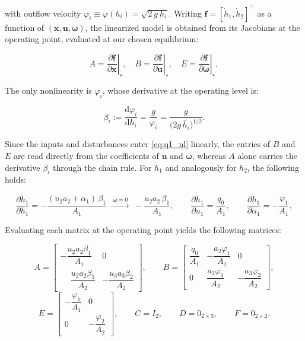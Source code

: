 \documentclass[10pt,a4paper]{scrartcl}
\begin{document}
with outflow velocity $\varphi_i \equiv \varphi(h_i) = \sqrt{2 \ g \ h_i}$. Writing $\bm f = [\dot h_1, \dot h_2]^\top$ as a function of $(\bm x, \bm u, \bm \omega)$, the linearized model is obtained from its Jacobians at the operating point, evaluated at our chosen equilibrium:

\begin{equation}
    A=\left.\frac{\partial\bm{f}}{\partial\bm{x}}\right|_\star,\quad
    B=\left.\frac{\partial\bm{f}}{\partial\bm{u}}\right|_\star,\quad
    E=\left.\frac{\partial\bm{f}}{\partial\bm{\omega}}\right|_\star,
    \label{eq:q1_jac}
\end{equation}

The only nonlinearity is $\varphi_i$, whose derivative at the operating level is: 


\begin{equation}
    \beta_i:=\frac{\mathrm{d}\varphi_i}{\mathrm{d}h_i}
    =\frac{g}{\varphi_i}=\frac{g}{\Big({2g\,\bar h_i}\Big)^{1/2}} .
    \label{eq:q1_beta}
\end{equation}

Since the inputs and disturbances enter \eqref{eq:q1_nl} linearly, the entries of $B$ and $E$ are read directly from the coefficients of $\bm u$ and $\bm \omega$, whereas $A$ alone carries the derivative $\beta_i$ through the chain rule. For $\dot h_1$ and analogously for $\dot h_2$, the following holds: 

\begin{equation}
    \frac{\partial\dot h_1}{\partial h_1}
    =-\frac{(u_2a_2+\alpha_1)\,\beta_1}{A_1}
    \;\xrightarrow{\ \bar{\bm{\omega}}=0\ }\;
    -\frac{u_2a_2\,\beta_1}{A_1},\qquad
    \frac{\partial\dot h_1}{\partial u_1}=\frac{q_0}{A_1},\qquad
    \frac{\partial\dot h_1}{\partial\alpha_1}=-\frac{\varphi_1}{A_1},
    \label{eq:q1_entries}
\end{equation}

Evaluating each matrix at the operating point yields the following matrices: 

\begin{equation}
    A=\begin{bmatrix}
        -\dfrac{u_2a_2\beta_1}{A_1} & 0\\[.2cm]
        \phantom{-}\dfrac{u_2a_2\beta_1}{A_2} & -\dfrac{u_3a_3\beta_2}{A_2}
      \end{bmatrix},\qquad
    B=\begin{bmatrix}
        \dfrac{q_0}{A_1} & -\dfrac{a_2\varphi_1}{A_1} & 0\\[.2cm]
        0 & \dfrac{a_2\varphi_1}{A_2} & -\dfrac{a_3\varphi_2}{A_2}
      \end{bmatrix},
    \label{eq:q1_A}
\end{equation}
\begin{equation}
    E=\begin{bmatrix}
        -\dfrac{\varphi_1}{A_1} & 0\\[.2cm]
        0 & -\dfrac{\varphi_2}{A_2}
      \end{bmatrix},\qquad
    C=I_2,\qquad D=0_{2\times3},\qquad F=0_{2\times2}.
    \label{eq:q1_B}
\end{equation}
\end{document}
